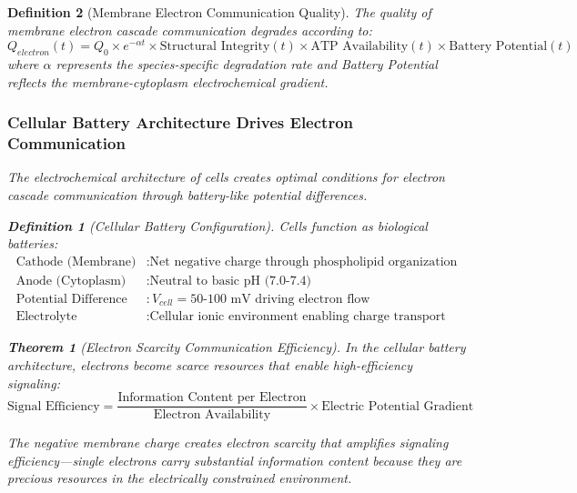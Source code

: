 \documentclass[12pt,a4paper]{article}
\newtheorem{theorem}{Theorem}
\newtheorem{definition}{Definition}
\begin{document}
\begin{definition}[Membrane Electron Communication Quality]
The quality of membrane electron cascade communication degrades according to:
\begin{equation}
Q_{electron}(t) = Q_0 \times e^{-\alpha t} \times \text{Structural Integrity}(t) \times \text{ATP Availability}(t) \times \text{Battery Potential}(t)
\end{equation}
where $\alpha$ represents the species-specific degradation rate and Battery Potential reflects the membrane-cytoplasm electrochemical gradient.

\subsubsection{Cellular Battery Architecture Drives Electron Communication}

The electrochemical architecture of cells creates optimal conditions for electron cascade communication through battery-like potential differences.

\begin{definition}[Cellular Battery Configuration]
Cells function as biological batteries:
\begin{align}
\text{Cathode (Membrane)} &: \text{Net negative charge through phospholipid organization} \\
\text{Anode (Cytoplasm)} &: \text{Neutral to basic pH (7.0-7.4)} \\
\text{Potential Difference} &: V_{cell} = 50\text{-}100 \text{ mV driving electron flow} \\
\text{Electrolyte} &: \text{Cellular ionic environment enabling charge transport}
\end{align}
\end{definition}

\begin{theorem}[Electron Scarcity Communication Efficiency]
In the cellular battery architecture, electrons become scarce resources that enable high-efficiency signaling:
\begin{equation}
\text{Signal Efficiency} = \frac{\text{Information Content per Electron}}{\text{Electron Availability}} \times \text{Electric Potential Gradient}
\end{equation}
\end{theorem}

The negative membrane charge creates electron scarcity that amplifies signaling efficiency—single electrons carry substantial information content because they are precious resources in the electrically constrained environment.
\end{definition}
\end{document}
